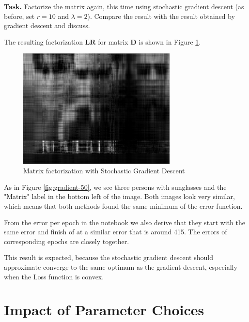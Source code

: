 \documentclass{support/acm_proc_article-sp}
\begin{document}
    \textbf{Task.} Factorize the matrix again, this time using stochastic gradient descent (as before, set
    $r = 10$ and $\lambda = 2$).
    Compare the result with the result obtained by gradient descent and discuss.

    The resulting factorization $\mathbf{LR}$ for matrix $\mathbf{D}$ is shown in Figure \ref{fig:sgradient}.
    \begin{figure}[htbp]
        \centering
        \includegraphics[width=8cm]{images/sgradient.png}
        \caption{Matrix factorization with Stochastic Gradient Descent}
        \label{fig:sgradient}
    \end{figure}
    As in Figure \ref{fig:gradient-50}, we see three persons with sunglasses and the "Matrix" label in the bottom
    left of the image.
    Both images look very similar, which means that both methods found the same minimum of the error function.

    From the error per epoch in the notebook we also derive that they start with the same error and finish of at a similar
    error that is around 415.
    The errors of corresponding epochs are closely together.

    This result is expected, because the stochastic gradient descent should approximate converge to the same
    optimum as the gradient descent, especially when the Loss function is convex.


    \section{Impact of Parameter Choices}
\end{document}
